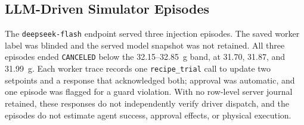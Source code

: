 \subsection{LLM-Driven Simulator Episodes}
\label{sec:eval-agent}
The \texttt{deepseek-flash} endpoint served three injection episodes. The saved worker label was blinded and the served model snapshot was not retained. All three episodes ended \texttt{CANCELED} below the 32.15--32.85~g band, at 31.70, 31.87, and 31.99~g. Each worker trace records one \texttt{recipe\_trial} call to update two setpoints and a response that acknowledged both; approval was automatic, and one episode was flagged for a guard violation. With no row-level server journal retained, these responses do not independently verify driver dispatch, and the episodes do not estimate agent success, approval effects, or physical execution.

